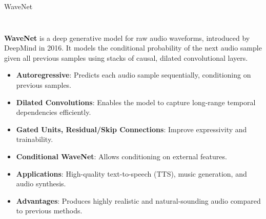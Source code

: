 \begin{frame}[allowframebreaks]{WaveNet}
\begin{columns}
\begin{column}{0.18\linewidth}
\begin{figure}
            \end{figure}
        \end{column}
    \end{columns}

    \framebreak

    \textbf{WaveNet} is a deep generative model for raw audio waveforms, introduced by DeepMind in 2016. It models the conditional probability of the next audio sample given all previous samples using stacks of causal, dilated convolutional layers.

    \begin{itemize}
        \item \textbf{Autoregressive}: Predicts each audio sample sequentially, conditioning on previous samples.
        \item \textbf{Dilated Convolutions}: Enables the model to capture long-range temporal dependencies efficiently.
        \item \textbf{Gated Units, Residual/Skip Connections}: Improve expressivity and trainability.
        \item \textbf{Conditional WaveNet}: Allows conditioning on external features.
        \item \textbf{Applications}: High-quality text-to-speech (TTS), music generation, and audio synthesis.
        \item \textbf{Advantages}: Produces highly realistic and natural-sounding audio compared to previous methods.
    \end{itemize}
\end{frame}